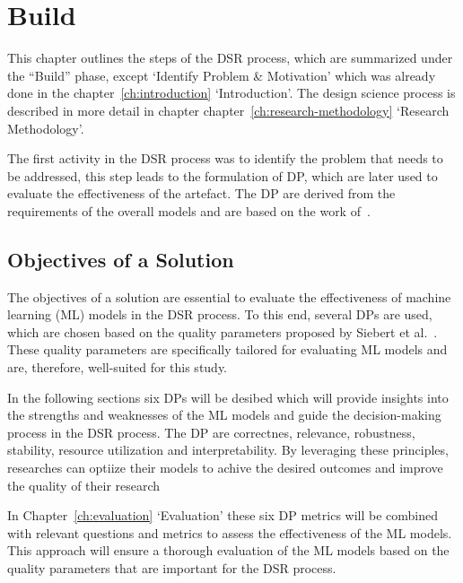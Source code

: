 \chapter{Build}\label{ch:build}
This chapter outlines the steps of the \ac{DSR} process, which are
summarized under the ``Build'' phase, except `Identify Problem \& Motivation' which was already done in the
chapter~\ref{ch:introduction} `Introduction'.
The design science process is described in more detail in chapter
chapter~\ref{ch:research-methodology} `Research Methodology'.

The first activity in the DSR process was to identify the problem that needs to be addressed,
this step leads to the formulation of \ac{DP}, which are later used to evaluate
the effectiveness of the artefact.
The \ac{DP} are derived from the requirements of the overall models and are based on
the work of~\cite{siebert2022construction}.



\section{Objectives of a Solution}\label{sec:objectives-of-a-solution}

The objectives of a solution are essential to evaluate the effectiveness of machine learning (ML) models in the
DSR process.
To this end, several DPs are used, which are chosen based on the quality parameters proposed by Siebert et
al.~\cite{siebert2022construction}.
These quality parameters are specifically tailored for evaluating ML models and are, therefore, well-suited for this
study.

In the following sections six DPs will be desibed which will provide insights into the strengths and weaknesses of the
ML models and guide the decision-making process in the DSR process.
The \ac{DP} are correctnes, relevance, robustness, stability, resource utilization and interpretability.
By leveraging these principles, researches can optiize their models to achive the desired outcomes and improve the
quality of their research

In Chapter~\ref{ch:evaluation} `Evaluation' these six DP metrics will be combined with relevant questions and metrics to
assess the effectiveness of the ML models.
This approach will ensure a thorough evaluation of the ML models based on the quality parameters that are important
for the DSR process.


